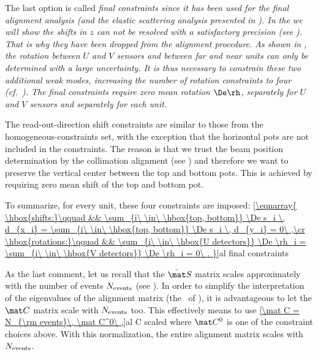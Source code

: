 \> The last option is called \em{final constraints} since it has been used for the final alignment analysis (and the elastic scattering analysis presented in ). In the  we will show the shifts in $z$ can not be resolved with a satisfactory precision (see ). That is why they have been dropped from the alignment procedure. As shown in , the rotation between $U$ and $V$ sensors and between far and near units can only be determined with a large uncertainty. It is thus necessary to constrain these two additional weak modes, increasing the number of rotation constraints to four (cf.~). The final constraints require zero mean rotation $\De\rh$, separately for $U$ and $V$ sensors and separately for each unit.
\par\parindent\itindent\indent\hang
The read-out-direction shift constraints are similar to those from the homogeneous-constraints set, with the exception that the horizontal pots are not included in the constraints. The reason is that we trust the beam position determination by the collimation alignment (see ) and therefore we want to preserve the vertical center between the top and bottom pots. This is achieved by requiring zero mean shift of the top and bottom pot.
\par\parindent\itindent\indent\hang
To summarize, for every unit, these four constraints are imposed:
\eqref{\eqnarray{
\hbox{shifts:}\qquad && \sum_{i\ \in\ \hbox{top, bottom}} \De s_i \, d_{x_i} = \sum_{i\ \in\ \hbox{top, bottom}} \De s_i \, d_{y_i} = 0\ ,\cr
\hbox{rotations:}\qquad && \sum_{i\ \in\ \hbox{U detectors}} \De \rh_i = \sum_{i\ \in\ \hbox{V detectors}} \De \rh_i = 0\ .
}}{al final constraints}

\iffalse
\eqref{
	C = \pmatrix{
		\vdots	&\vdots	&		&		& \cr
		d_{ix}	&d_{iy}	&		&		& \cr
		\vdots	&\vdots	&		&		& \cr
				&		&\vdots	&\vdots	& \cr
				&		&d_{ix}	&d_{iy}	& \cr
				&		&\vdots	&\vdots	& \cr\ln
				&		&		&		&1		&0		& 		& 	\cr
				&		&		&		&0		&1		& 		& 	\cr
				&		&		&		&1		&0		& 		& 	\cr
				&		&		&		&0		&1		& 		& 	\cr
				&		&		&		&\vdots	&\vdots	& 		& 	\cr
				&		&		&		&		&		&1		&0		\cr
				&		&		&		&		&		&0		&1		\cr
				&		&		&		&		&		&1		&0		\cr
				&		&		&		&		&		&0		&1		\cr
				&		&		&		&		&		&\vdots	&\vdots	\cr
	}
}{al final cnst ex}
\fi

As the last comment, let us recall that the $\tilde\mat S$ matrix scales approximately with the number of events $N_{\rm events}$ (see ). In order to simplify the interpretation of the eigenvalues of the alignment matrix (the \lhs~of ), it is advantageous to let the $\mat C$ matrix scale with $N_{\rm events}$ too. This effectively means to use
\eqref{\mat C = N_{\rm events}\, \mat C^0\ ,}{al C scaled}
where $\mat C^0$ is one of the constraint choices above. With this normalization, the entire alignment matrix scales with $N_{\rm events}$.


